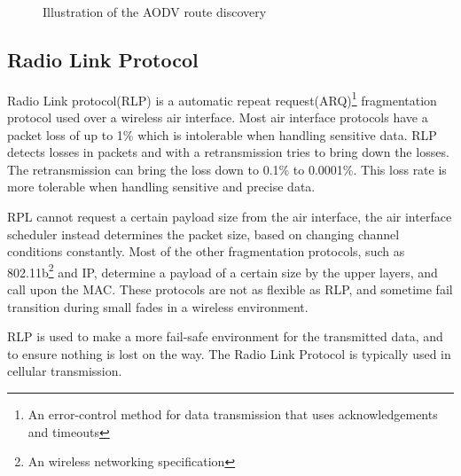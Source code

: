 \begin{figure}[!h]
	\centering
	\caption{Illustration of the AODV route discovery}
	\label{fig:AODVfigure}
\end{figure}


\subsection{Radio Link Protocol}
Radio Link protocol(RLP) is a automatic repeat request(ARQ)\footnote{An error-control method for data transmission that uses acknowledgements and timeouts} fragmentation protocol used over a wireless air interface.
Most air interface protocols have a packet loss of up to 1\% which is intolerable when handling sensitive data.
RLP detects losses in packets and with a retransmission tries to bring down the losses.
The retransmission can bring the loss down to 0.1\% to 0.0001\%.
This loss rate is more tolerable when handling sensitive and precise data.

RPL cannot request a certain payload size from the air interface, the air interface scheduler instead determines the packet size, based on changing channel conditions constantly.
Most of the other fragmentation protocols, such as 802.11b\footnote{An wireless networking specification} and IP, determine a payload of a certain size by the upper layers, and call upon the MAC.
These protocols are not as flexible as RLP, and sometime fail transition during small fades in a wireless environment.\cite{MobileComm}

RLP is used to make a more fail-safe environment for the transmitted data, and to ensure nothing is lost on the way.
The Radio Link Protocol is typically used in cellular transmission.